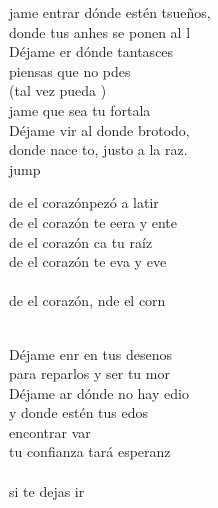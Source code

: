 \begin{cancion}%
	jame entrar dónde estén tsueños,\\
	donde tus anhes se ponen al l  \\
	Déjame er dónde tantasces  \\
	piensas que no pdes \\
	(tal vez pueda )\\
	jame que sea tu fortala  \\
	Déjame vir al donde brotodo, \\
	donde nace to, justo a la raz. \\jump\\
	\begin{chorus}%
	de el corazónpezó a latir  \\
	de el corazón te eera y ente  \\
	de el corazón ca tu raíz  \\
	de el corazón te eva y eve  \\
{}\vspace*{-0.4cm}\\
	de el corazón, nde el corn  \\
	\end{chorus}%
	\jump\\
	Déjame enr en tus desenos  \\
	para reparlos y ser tu mor  \\
	Déjame ar dónde no hay edio \\
	y donde estén tus edos \\
	encontrar var \\
	tu confianza tará esperanz\\
	\jump\\
si te dejas ir \\

\end{cancion}
